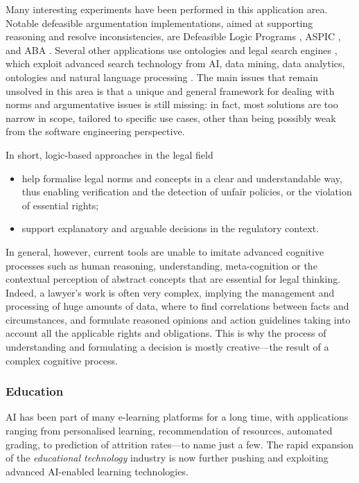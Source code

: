 \documentclass[12pt,a4paper,openright,twoside]{book}
\begin{document}
Many interesting experiments have been performed in this application area.
%
Notable defeasible argumentation implementations, aimed at supporting reasoning and resolve inconsistencies, are Defeasible Logic Programs \cite{garcia2004}, ASPIC \cite{modgil2014}, and ABA \cite{dung2009}.
%
Several other applications use ontologies and legal search engines \cite{solarte2016}, which exploit advanced search technology from AI, data mining, data analytics, ontologies and natural language processing \cite{kerikmae2018}.
%
The main issues that remain unsolved in this area is that a unique and general framework for dealing with norms and argumentative issues is still missing: in fact, most solutions are too narrow in scope, tailored to specific use cases, other than being possibly weak from the software engineering perspective.

In short, logic-based approaches in the legal field \cite{Prakken2015}
%
\begin{itemize}
    \item help formalise legal norms and concepts in a clear and understandable way, thus enabling verification and the detection of
unfair policies, or the violation of essential rights;
    \item support explanatory and arguable decisions in the regulatory context.
\end{itemize}

In general, however, current tools are unable to imitate advanced cognitive processes such as human reasoning, understanding, meta-cognition or the contextual perception of abstract concepts that are essential for legal thinking.
%
Indeed, a lawyer's work is often very complex, implying the management and processing of huge amounts of data, where to find correlations between facts and circumstances, and formulate reasoned opinions and action guidelines taking into account all the applicable rights and obligations.
%
This is why the process of understanding and formulating a decision is mostly creative---the result of a complex cognitive process.


\subsubsection{Education}\label{sssec:ai-and-education}

AI has been part of many e-learning platforms for a long time, with applications ranging from personalised learning, recommendation of resources, automated grading, to prediction of attrition rates---to name just a few.
%
The rapid expansion of the \emph{educational technology} industry is now further pushing and exploiting advanced AI-enabled learning technologies.
\end{document}
